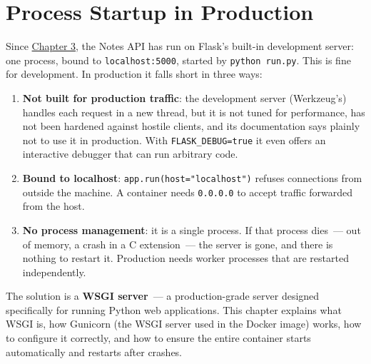 \setcounter{chapter}{23}
\chapter{Process Startup in Production}\label{ch:24-process-startup}

\chapterrule

Since \hyperref[ch:03-network-capability]{Chapter 3}, the Notes API has run on Flask's built-in development server: one process, bound to \texttt{localhost:5000}, started by \texttt{python\ run.py}. This is fine for development. In production it falls short in three ways:

\begin{enumerate}
\def\labelenumi{\arabic{enumi}.}
\tightlist
\item
  \textbf{Not built for production traffic}: the development server (Werkzeug's) handles each request in a new thread, but it is not tuned for performance, has not been hardened against hostile clients, and its documentation says plainly not to use it in production. With \texttt{FLASK\_DEBUG=true} it even offers an interactive debugger that can run arbitrary code.
\item
  \textbf{Bound to localhost}: \texttt{app.}\allowbreak{}\texttt{run(host=}\allowbreak{}\texttt{"localhost")} refuses connections from outside the machine. A container needs \texttt{0.0.0.0} to accept traffic forwarded from the host.
\item
  \textbf{No process management}: it is a single process. If that process dies~--- out of memory, a crash in a C extension~--- the server is gone, and there is nothing to restart it. Production needs worker processes that are restarted independently.
\end{enumerate}

\noindent{}The solution is a \textbf{WSGI server}~--- a production-grade server designed specifically for running Python web applications. This chapter explains what WSGI is, how Gunicorn (the WSGI server used in the Docker image) works, how to configure it correctly, and how to ensure the entire container starts automatically and restarts after crashes.

